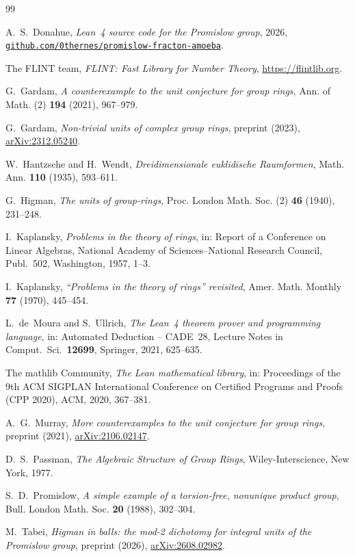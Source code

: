 \documentclass[11pt,colorlinks]{charlie}
\begin{document}
\begin{thebibliography}{99}

A.~S.~Donahue, \emph{Lean~4 source code for the Promislow group}, 2026, \href{https://github.com/0thernes/promislow-fracton-amoeba}{\nolinkurl{github.com/0thernes/promislow-fracton-amoeba}}.

The FLINT team, \emph{FLINT: Fast Library for Number Theory}, \url{https://flintlib.org}.

G.~Gardam, \emph{A counterexample to the unit conjecture for group rings}, Ann. of Math. (2) \textbf{194} (2021), 967--979.

G.~Gardam, \emph{Non-trivial units of complex group rings}, preprint (2023), \href{https://arxiv.org/abs/2312.05240}{arXiv:2312.05240}.

W.~Hantzsche and H.~Wendt, \emph{Dreidimensionale euklidische Raumformen}, Math. Ann. \textbf{110} (1935), 593--611.

G.~Higman, \emph{The units of group-rings}, Proc. London Math. Soc. (2) \textbf{46} (1940), 231--248.

I.~Kaplansky, \emph{Problems in the theory of rings}, in: Report of a Conference on Linear Algebras, National Academy of Sciences--National Research Council, Publ.~502, Washington, 1957, 1--3.

I.~Kaplansky, \emph{``Problems in the theory of rings'' revisited}, Amer. Math. Monthly \textbf{77} (1970), 445--454.

L.~de~Moura and S.~Ullrich, \emph{The Lean~4 theorem prover and programming language}, in: Automated Deduction -- CADE~28, Lecture Notes in Comput.\ Sci.\ \textbf{12699}, Springer, 2021, 625--635.

The mathlib Community, \emph{The Lean mathematical library}, in: Proceedings of the 9th ACM SIGPLAN International Conference on Certified Programs and Proofs (CPP 2020), ACM, 2020, 367--381.

A.~G.~Murray, \emph{More counterexamples to the unit conjecture for group rings}, preprint (2021), \href{https://arxiv.org/abs/2106.02147}{arXiv:2106.02147}.

D.~S.~Passman, \emph{The Algebraic Structure of Group Rings}, Wiley-Interscience, New York, 1977.

S.~D.~Promislow, \emph{A simple example of a torsion-free, nonunique product group}, Bull. London Math. Soc. \textbf{20} (1988), 302--304.

M.~Tabei, \emph{Higman in balls: the mod-2 dichotomy for integral units of the Promislow group}, preprint (2026), \href{https://arxiv.org/abs/2608.02982}{arXiv:2608.02982}.

\end{thebibliography}
\end{document}
